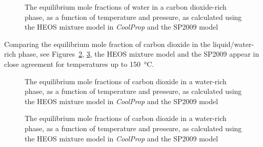     \begin{figure}[H]
        \centering
                 
        \caption[Comparison of the equilibrium mole fractions of water in a carbon dioxide-rich phase]{The equilibrium mole fractions of water in a carbon dioxide-rich phase, as a function of temperature and pressure, as calculated using the \ac{HEOS} mixture model in \emph{CoolProp} and the \ac{SP2009} model}
        \label{fig:SP2009vsCoolProp_yH2O}
    \end{figure}
    

    Comparing the equilibrium mole fraction of carbon dioxide in the liquid/water-rich phase, see Figures~\ref{fig:SP2009vsCoolProp_xCO2_part2}, \ref{fig:SP2009vsCoolProp_xCO2_part1}, the \ac{HEOS} mixture model and the \ac{SP2009} appear in close agreement for temperatures up to \qty{150}{\degreeCelsius}.
    
    \begin{figure}[H]
        \centering
        
        \caption[Comparison of the equilibrium mole fractions of carbon dioxide in a water-rich phase. Part 1.]{The equilibrium mole fractions of carbon dioxide in a water-rich phase, as a function of temperature and pressure, as calculated using the \ac{HEOS} mixture model in \emph{CoolProp} and the \ac{SP2009} model}
        \label{fig:SP2009vsCoolProp_xCO2_part2}
    \end{figure}
    
    \begin{figure}[H]
        \centering
        
        \caption[Comparison of the equilibrium mole fractions of carbon dioxide in a water-rich phase. Part 2.]{The equilibrium mole fractions of carbon dioxide in a water-rich phase, as a function of temperature and pressure, as calculated using the \ac{HEOS} mixture model in \emph{CoolProp} and the \ac{SP2009} model}
        \label{fig:SP2009vsCoolProp_xCO2_part1}
    \end{figure}

    